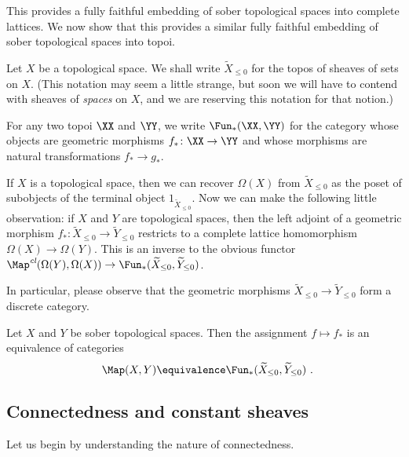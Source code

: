This provides a fully faithful embedding of sober topological spaces into complete lattices.
We now show that this provides a similar fully faithful embedding of sober topological spaces into topoi.

\begin{ntn}
	Let $ X $ be a topological space.
	We shall write $ \widetilde{X}_{\leq 0} $ for the topos of sheaves of sets on $ X $.
	(This notation may seem a little strange, but soon we will have to contend with sheaves of \emph{spaces} on $ X $, and we are reserving this notation for that notion.)

	For any two topoi $ \XX $ and $ \YY $, we write $ \Funlowerstar( \XX, \YY ) $ for the category whose objects are geometric morphisms $ f_{\ast} \colon \XX \to \YY $ and whose morphisms are natural transformations $ f_{\ast} \to g_{\ast} $.
\end{ntn}

\begin{nul}
	If $ X $ is a topological space, then we can recover $ \Omega(X) $ from $ \widetilde{X}_{\leq 0} $ as the poset of subobjects of the terminal object $1_{\widetilde{X}_{\leq 0}}$.
	Now we can make the following little observation: if $ X $ and $ Y $ are topological spaces, then the left adjoint of a geometric morphism $ f_{\ast} \colon \widetilde{X}_{\leq 0} \to \widetilde{Y}_{\leq 0} $ restricts to a complete lattice homomorphism $ \Omega(X) \to \Omega(Y) $.
	This is an inverse to the obvious functor $ \Map^{\textit{cl}}(\Omega(Y), \Omega(X)) \to \Funlowerstar(\widetilde{X}_{\leq 0}, \widetilde{Y}_{\leq 0})$.

	In particular, please observe that the geometric morphisms $ \widetilde{X}_{\leq 0} \to \widetilde{Y}_{\leq 0} $ form a discrete category.
\end{nul}

\begin{cor}
	Let $ X $ and $ Y $ be sober topological spaces.
	Then the assignment $ f \mapsto f_{\ast} $ is an equivalence of categories
	\[
		\Map(X, Y) \equivalence \Funlowerstar(\widetilde{X}_{\leq 0}, \widetilde{Y}_{\leq 0}) \period
	\]
\end{cor}

\subsection*{Connectedness and constant sheaves}

Let us begin by understanding the nature of connectedness.

